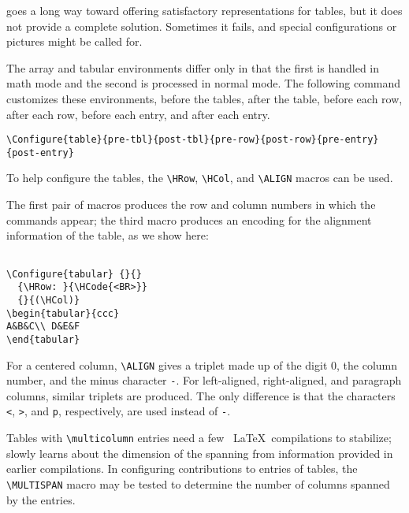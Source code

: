 
\texht goes a long way toward offering satisfactory representations for
tables, but it does not provide a complete solution. Sometimes it fails,
and special configurations or pictures might be called for. 


The array and tabular environments differ only in that the first is handled in 
math mode and the second is processed in normal mode. The following command 
customizes these environments, before the tables, after the table, before each row, 
after each row, before each entry, and after each entry. 

\begin{lstlisting}
\Configure{table}{pre-tbl}{post-tbl}{pre-row}{post-row}{pre-entry}{post-entry} 
\end{lstlisting}

To help configure the tables, the \verb|\HRow|, \verb|\HCol|, and \verb|\ALIGN| macros can be used. 
  

The first pair of macros produces the row and column numbers in which
the commands appear; the third macro produces an encoding for the
alignment information of the table, as we show here: 

\begin{verbatim}

\Configure{tabular} {}{} 
  {\HRow: }{\HCode{<BR>}} 
  {}{(\HCol)} 
\begin{tabular}{ccc} 
A&B&C\\ D&E&F 
\end{tabular} 

\end{verbatim}

For a centered column, \verb|\ALIGN| gives a triplet made up of the digit 0, the column number, and the minus character \verb|-|. For left-aligned, right-aligned, and paragraph columns, similar triplets are produced. The only difference is that the characters \verb|<|, \verb|>|, and \verb|p|, respectively, are used instead of \verb|-|. 

Tables with \verb|\multicolumn| entries need a few \ \LaTeX\
compilations to stabilize; \texht slowly learns about the dimension of
the spanning from information provided in earlier compilations. In
configuring contributions to entries of tables, the \verb|\MULTISPAN|
macro may be tested to determine the number of columns spanned by the
entries. 
 

